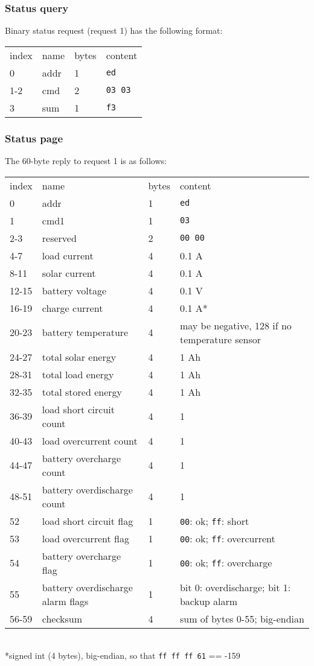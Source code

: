 \documentclass[pdftex,oneside,12pt,a4paper]{book}
\begin{document}
\subsubsection{Status query}
Binary status request (request 1) has the following format:\\
\begin{tabular}{llll}
index & name & bytes & content\\
0 & addr & 1 & \verb|ed|\\
1-2 & cmd & 2 & \verb|03 03|\\
3 & sum & 1 & \verb|f3|
\end{tabular}

\subsubsection{Status page}
The 60-byte reply to request 1 is as follows:\\
\begin{supertabular}{llll}
index & name & bytes & content\\
0 & addr & 1 & \verb|ed|\\
1 & cmd1 & 1 & \verb|03|\\
2-3 & reserved & 2 & \verb|00 00|\\
4-7 & load current & 4 & 0.1 A\\
8-11 & solar current & 4 & 0.1 A\\
12-15 & battery voltage & 4 & 0.1 V\\
16-19 & charge current & 4 & 0.1 A*\\
20-23 & battery temperature & 4 & may be negative, 128 if no temperature sensor\\
24-27 & total solar energy & 4 & 1 Ah\\
28-31 & total load energy & 4 & 1 Ah\\
32-35 & total stored energy & 4 & 1 Ah\\
36-39 & load short circuit count & 4 & 1\\
40-43 & load overcurrent count & 4 & 1\\
44-47 & battery overcharge count & 4 & 1\\
48-51 & battery overdischarge count & 4 & 1\\
52 & load short circuit flag & 1 & \verb|00|: ok; \verb|ff|: short\\
53 & load overcurrent flag & 1 & \verb|00|: ok; \verb|ff|: overcurrent\\
54 & battery overcharge flag & 1 & \verb|00|: ok; \verb|ff|: overcharge\\
55 & battery overdischarge alarm flags & 1 & bit 0: overdischarge; bit 1: backup alarm\\
56-59 & checksum & 4 & sum of bytes 0-55; big-endian\\
\end{supertabular}\\
{*}signed int (4 bytes), big-endian, so that \verb|ff ff ff 61| == -159
\end{document}
